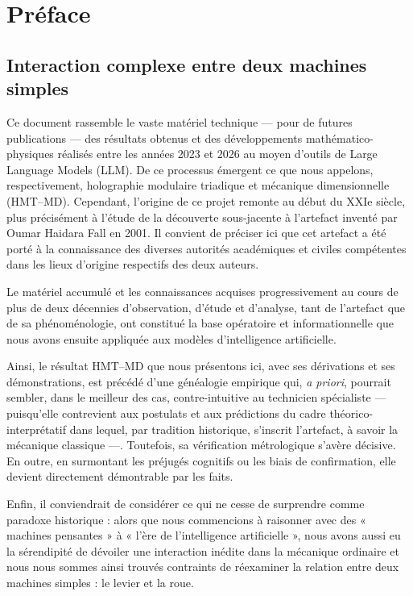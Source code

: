 \chapter*{Préface}

\section*{Interaction complexe entre deux machines simples}
{}

Ce document rassemble le vaste matériel technique — pour de futures publications — des résultats obtenus et des développements mathématico-physiques réalisés entre les années 2023 et 2026 au moyen d'outils de Large Language Models (LLM). De ce processus émergent ce que nous appelons, respectivement, holographie modulaire triadique et mécanique dimensionnelle (HMT–MD). Cependant, l'origine de ce projet remonte au début du XXIe siècle, plus précisément à l'étude de la découverte sous-jacente à l'artefact inventé par Oumar Haidara Fall en 2001. Il convient de préciser ici que cet artefact a été porté à la connaissance des diverses autorités académiques et civiles compétentes dans les lieux d'origine respectifs des deux auteurs.

Le matériel accumulé et les connaissances acquises progressivement au cours de plus de deux décennies d'observation, d'étude et d'analyse, tant de l'artefact que de sa phénoménologie, ont constitué la base opératoire et informationnelle que nous avons ensuite appliquée aux modèles d'intelligence artificielle.

Ainsi, le résultat HMT–MD que nous présentons ici, avec ses dérivations et ses démonstrations, est précédé d'une généalogie empirique qui, \textit{a priori}, pourrait sembler, dans le meilleur des cas, contre-intuitive au technicien spécialiste — puisqu'elle contrevient aux postulats et aux prédictions du cadre théorico-interprétatif dans lequel, par tradition historique, s'inscrit l'artefact, à savoir la mécanique classique —. Toutefois, sa vérification métrologique s'avère décisive. En outre, en surmontant les préjugés cognitifs ou les biais de confirmation, elle devient directement démontrable par les faits.

Enfin, il conviendrait de considérer ce qui ne cesse de surprendre comme paradoxe historique : alors que nous commencions à raisonner avec des « machines pensantes » à « l'ère de l'intelligence artificielle », nous avons aussi eu la sérendipité de dévoiler une interaction inédite dans la mécanique ordinaire et nous nous sommes ainsi trouvés contraints de réexaminer la relation entre deux machines simples : le levier et la roue.
